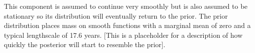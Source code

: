 This component is assumed to continue very smoothly but is also assumed to be stationary so its distribution will eventually return to the prior.
The prior distribution places mass on smooth functions with a marginal mean of zero and a typical lengthscale of 17.6 years.
[This is a placeholder for a description of how quickly the posterior will start to resemble the prior].
